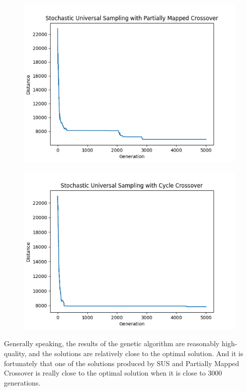 \documentclass[letterpaper, 12 pt, conference]{ieeeconf}  %
\begin{document}
\begin{figure}[h!]
    \centering
    \includegraphics{project-style-files/ga3.png}
\end{figure}
\begin{figure}[h!]
    \centering
    \includegraphics{project-style-files/ga4.png}
\end{figure}
\newpage
\hfill\break
Generally speaking, the results of the genetic algorithm are reasonably high-quality, and the solutions are relatively close to the optimal solution. And it is fortunately that one of the solutions produced by SUS and Partially Mapped Crossover is really close to the optimal solution when it is close to 3000 generations.
\end{document}
